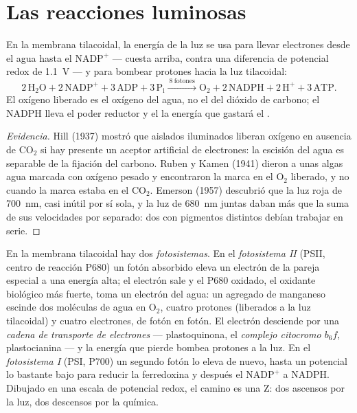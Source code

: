 \section{Las reacciones luminosas}

\begin{proposition}\label{prop:b1:photosynthesis:lightreactions}
En la membrana tilacoidal, la energía de la luz se usa para llevar
electrones desde el agua hasta el $\mathrm{NADP^+}$ --- cuesta arriba,
contra una diferencia de potencial redox de \qty{1.1}{V} --- y para bombear
protones hacia la luz tilacoidal:
\[
2\,\mathrm{H_2O} + 2\,\mathrm{NADP^+} + 3\,\mathrm{ADP} + 3\,\mathrm{P_i}
\xrightarrow{\ 8\ \text{fotones}\ }
\mathrm{O_2} + 2\,\mathrm{NADPH} + 2\,\mathrm{H^+} + 3\,\mathrm{ATP} .
\]
El oxígeno liberado es el oxígeno del agua, no el del dióxido de carbono; el
NADPH lleva el poder reductor y el  la energía que gastará el .
\end{proposition}
\begin{proof}[Evidencia]
Hill (1937) mostró que  aislados iluminados liberan oxígeno en
ausencia de $\mathrm{CO_2}$ si hay presente un aceptor artificial de
electrones: la escisión del agua es separable de la fijación del carbono.
Ruben y Kamen (1941) dieron a unas algas agua marcada con oxígeno pesado y
encontraron la marca en el $\mathrm{O_2}$ liberado, y no cuando la marca
estaba en el $\mathrm{CO_2}$. Emerson (1957) descubrió que la luz roja de
\qty{700}{nm}, casi inútil por sí sola, y la luz de \qty{680}{nm} juntas
daban más que la suma de sus velocidades por separado: dos  con
pigmentos distintos debían trabajar en serie.
\end{proof}

\begin{definition}\label{def:b1:photosynthesis:zscheme}
En la membrana tilacoidal hay dos \emph{fotosistemas}. En el
\emph{fotosistema II} (PSII, centro de reacción P680) un fotón absorbido
eleva un electrón de la pareja especial a una energía alta; el electrón sale
y el P680 oxidado, el oxidante biológico más fuerte, toma un electrón del
agua: un agregado de manganeso escinde dos moléculas de agua en
$\mathrm{O_2}$, cuatro protones (liberados a la luz tilacoidal) y cuatro
electrones, de fotón en fotón. El electrón desciende por una \emph{cadena de
transporte de electrones} --- plastoquinona, el \emph{complejo citocromo
$b_6f$}, plastocianina --- y la energía que pierde bombea protones a la luz.
En el \emph{fotosistema I} (PSI, P700) un segundo fotón lo eleva de nuevo,
hasta un potencial lo bastante bajo para reducir la ferredoxina y después el
$\mathrm{NADP^+}$ a NADPH. Dibujado en una escala de potencial redox, el
camino es una Z: dos ascensos por la luz, dos descensos por la química.
\end{definition}

